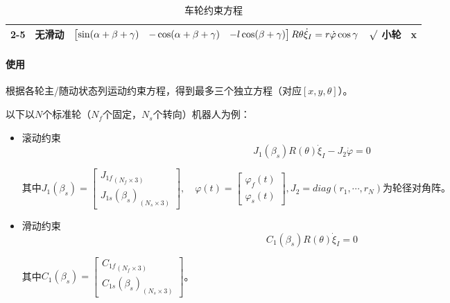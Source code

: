 \documentclass[
12pt, %
a4paper, 
oneside, %
]{scrartcl}
\begin{document}
\begin{table}[H]
\begin{tabular}{|p{0.9cm}|p{1.3cm}|p{10.5cm}|p{1.4cm}|p{1.3cm}|}
\cline{2-5}
& 无滑动 & $ \begin{bmatrix} \sin(\alpha + \beta + \gamma) & -\cos(\alpha + \beta + \gamma) & -l \cos(\beta + \gamma) \end{bmatrix} R \theta \dot{\xi}_I \newline = r \dot{\varphi} \cos\gamma $ & $ \surd $ \newline 小轮 & x \\
\hline
\end{tabular}
\caption{车轮约束方程}
\end{table}
\paragraph{使用}
根据各轮主/随动状态列运动约束方程，得到最多三个独立方程（对应$ [x, y ,\theta] $）。

以下以$ N $个标准轮（$ N_f $个固定，$ N_s $个转向）机器人为例：
\begin{itemize}
\item 滚动约束
$$ J_1(\beta_s) R(\theta) \dot{\xi}_I - J_2 \dot{\varphi} = 0 $$

其中$ J_1(\beta_s) =  \begin{bmatrix} {J_{1f}}_{(N_f \times 3)} \\ {J_{1s}(\beta_s)}_{(N_s \times 3)} \end{bmatrix}, \quad \varphi(t) = \begin{bmatrix} \varphi_f(t) \\ \varphi_s(t) \end{bmatrix}, J_2 = diag(r_1, \cdots, r_N)\text{为轮径对角阵} $。
\item 滑动约束
$$ C_1(\beta_s) R(\theta) \dot{\xi}_I = 0 $$

其中$ C_1(\beta_s) = \begin{bmatrix} {C_{1f}}_{(N_f \times 3)} \\ {C_{1s}(\beta_s)}_{(N_s \times 3)} \end{bmatrix} $。
\end{itemize}
\end{document}
